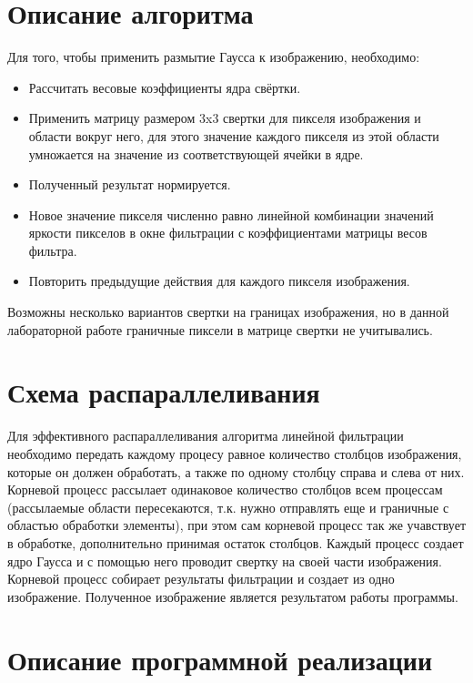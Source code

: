 \documentclass{report}
\begin{document}
\section*{Описание алгоритма}
Для того, чтобы применить размытие Гаусса к изображению, необходимо: \par
\begin{itemize}
\item Рассчитать весовые коэффициенты ядра свёртки.
\item Применить матрицу  размером 3x3  свертки для пикселя изображения и области вокруг него, для этого значение каждого пикселя из этой области умножается на значение из соответствующей ячейки в ядре.
\item Полученный результат нормируется.
\item Новое значение пикселя численно равно линейной комбинации значений яркости пикселов в окне фильтрации с коэффициентами матрицы весов фильтра.
\item Повторить предыдущие действия для каждого пикселя изображения.
\end{itemize}
\par Возможны несколько вариантов свертки на границах изображения, но в данной лабораторной работе граничные пиксели в матрице свертки не учитывались.
\newpage

\section*{Схема распараллеливания}
\par Для эффективного распараллеливания алгоритма линейной фильтрации необходимо передать каждому процесу равное количество столбцов изображения, которые он должен обработать, а также по одному столбцу справа и слева от них. Корневой процесс рассылает одинаковое количество столбцов всем процессам (рассылаемые области пересекаются, т.к. нужно отправлять еще и граничные с областью обработки элементы), при этом сам корневой процесс так же учавствует в обработке, дополнительно принимая остаток столбцов. Каждый процесс создает ядро Гаусса и с помощью него проводит свертку на своей части изображения. Корневой процесс собирает результаты фильтрации и создает из одно изображение. Полученное изображение является результатом работы программы.
\newpage

\section*{Описание программной реализации}
\end{document}

